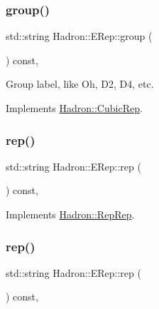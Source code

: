 \subsubsection{\texorpdfstring{group()}{group()}\hspace{0.1cm}{\footnotesize\ttfamily [2/2]}}
{\footnotesize\ttfamily std\+::string Hadron\+::\+E\+Rep\+::group (\begin{DoxyParamCaption}{ }\end{DoxyParamCaption}) const\hspace{0.3cm}{\ttfamily [inline]}, {\ttfamily [virtual]}}

Group label, like Oh, D2, D4, etc. 

Implements \mbox{\hyperlink{structHadron_1_1CubicRep_a0748f11ec87f387062c8e8981339a29c}{Hadron\+::\+Cubic\+Rep}}.

\mbox{\label{structHadron_1_1ERep_a388db41e3463a65498dca9ba2e1b7960}} 
\subsubsection{\texorpdfstring{rep()}{rep()}\hspace{0.1cm}{\footnotesize\ttfamily [1/3]}}
{\footnotesize\ttfamily std\+::string Hadron\+::\+E\+Rep\+::rep (\begin{DoxyParamCaption}{ }\end{DoxyParamCaption}) const\hspace{0.3cm}{\ttfamily [inline]}, {\ttfamily [virtual]}}



Implements \mbox{\hyperlink{structHadron_1_1RepRep_ab3213025f6de249f7095892109575fde}{Hadron\+::\+Rep\+Rep}}.

\mbox{\label{structHadron_1_1ERep_a388db41e3463a65498dca9ba2e1b7960}} 
\subsubsection{\texorpdfstring{rep()}{rep()}\hspace{0.1cm}{\footnotesize\ttfamily [2/3]}}
{\footnotesize\ttfamily std\+::string Hadron\+::\+E\+Rep\+::rep (\begin{DoxyParamCaption}{ }\end{DoxyParamCaption}) const\hspace{0.3cm}{\ttfamily [inline]}, {\ttfamily [virtual]}}



